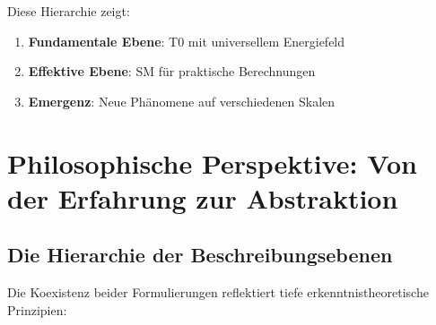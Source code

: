 	Diese Hierarchie zeigt:
	\begin{enumerate}
		\item \textbf{Fundamentale Ebene}: T0 mit universellem Energiefeld
		\item \textbf{Effektive Ebene}: SM für praktische Berechnungen
		\item \textbf{Emergenz}: Neue Phänomene auf verschiedenen Skalen
	\end{enumerate}
	
	\section{Philosophische Perspektive: Von der Erfahrung zur Abstraktion}
	
	\subsection{Die Hierarchie der Beschreibungsebenen}
	
	Die Koexistenz beider Formulierungen reflektiert tiefe erkenntnistheoretische Prinzipien:
	
